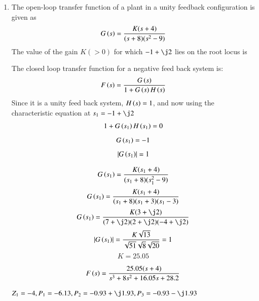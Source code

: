 \begin{enumerate}[label=\thesection.\arabic*.,ref=\thesection.\theenumi]

\item
 The open-loop transfer function of a plant in a unity feedback configuration is given as 
\begin{equation}
    G\left(s\right) = \frac{K(s+4)}{(s+8)(s^{2}-9)}
\end{equation}
 The value of the gain $K(>0)$ for which $-1 + \j2$ lies on the root locus is
    
  

\solution
  The closed loop transfer function for a negative feed back system is:
  \begin{equation}
      F\left(s\right) = \frac{G\left(s\right)}{1+G\left(s\right)H\left(s\right)}
  \end{equation}
Since it is a unity feed back system, $H\left(s\right) = 1$, and now using the characteristic equation at $s_{1} = -1 + \j2$
\begin{equation}
1 + G\left(s_{1}\right)H\left(s_{1}\right) = 0
\end{equation}
\begin{equation}
 G\left(s_{1}\right) = -1
\end{equation}
\begin{equation}
 \left\vert G\left(s_{1}\right)\right\vert = 1
\end{equation}


\begin{equation}
    G\left(s_{1}\right) = \frac{K(s_{1}+4)}{(s_{1}+8)(s_{1}^{2}-9)}
\end{equation}
\begin{equation}
    G\left(s_{1}\right) = \frac{K(s_{1}+4)}{(s_{1}+8)(s_{1}+3)(s_{1}-3)}
\end{equation}
\begin{equation}
    G\brak{s_{1}} = \frac{K(3+\j2)}{(7+\j2)(2+\j2)(-4+\j2)}
\end{equation}
\begin{equation}
    \left\vert G\left(s_{1}\right)\right\vert = \frac{K\sqrt{13}}{\sqrt{51}\sqrt{8}\sqrt{20}} = 1
\end{equation}
\begin{equation}
    K = 25.05
\end{equation}


\begin{equation}
    F\left(s\right) = \frac{25.05(s+4)}{s^{3}+8s^{2}+16.05s+28.2}
\end{equation}

    $Z_{1}=-4, P_{1}=-6.13, P_{2}=-0.93+\j1.93, P_{3}=-0.93-\j1.93$



\end{enumerate}

